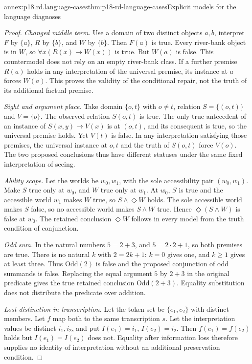 \begin{annexitem}{annex:p18.rd.language-cases}{thm:p18-rd-language-cases}{Explicit models for the language diagnoses}
\begin{proof}
\emph{Changed middle term.} Use a domain of two distinct objects
\(a,b\), interpret \(F\) by \(\{a\}\), \(R\) by
\(\{b\}\), and \(W\) by \(\{b\}\). Then \(F(a)\)
is true. Every river-bank object is in \(W\), so
\(\forall x(R(x)\to W(x))\) is true. But \(W(a)\) is false.
This countermodel does not rely on an empty river-bank class. If a
further premise \(R(a)\) holds in any interpretation of the
universal premise, its instance at \(a\) forces \(W(a)\).
This proves the validity of the conditional repair, not the truth
of its additional factual premise.

\emph{Sight and argument place.} Take domain \(\{o,t\}\)
with \(o\ne t\), relation \(S=\{(o,t)\}\) and
\(V=\{o\}\). The observed relation \(S(o,t)\) is true.
The only true antecedent of an instance of
\(S(x,y)\to V(x)\) is at \((o,t)\), and its consequent
is true, so the universal premise holds. Yet \(V(t)\) is false.
In any interpretation satisfying those premises, the universal
instance at \(o,t\) and the truth of \(S(o,t)\) force
\(V(o)\). The two proposed conclusions thus have different
statuses under the same fixed interpretation of seeing.

\emph{Ability scope.} Let the worlds be \(w_0,w_1\), with
the sole accessibility pair \((w_0,w_1)\). Make \(S\) true
only at \(w_0\), and \(W\) true only at \(w_1\).
At \(w_0\), \(S\) is true and the accessible world \(w_1\)
makes \(W\) true, so \(S\land\Diamond W\) holds.
The sole accessible world makes \(S\) false, so no accessible
world makes \(S\land W\) true. Hence
\(\Diamond(S\land W)\) is false at \(w_0\).
The retained conclusion \(\Diamond W\) follows in every model
from the truth condition of conjunction.

\emph{Odd sum.} In the natural numbers \(5=2+3\), and
\(5=2\cdot2+1\), so both premises are true. There is no natural
\(k\) with \(2=2k+1\): \(k=0\) gives one, and
\(k\geq1\) gives at least three. Thus \(\mathrm{Odd}(2)\)
is false and the proposed conjunction of odd summands is false.
Replacing the equal argument \(5\) by \(2+3\) in the
original predicate gives the true retained conclusion
\(\mathrm{Odd}(2+3)\). Equality substitution does not distribute
the predicate over addition.

\emph{Lost distinction in transcription.} Let the token set be
\(\{e_1,e_2\}\) with distinct members. Let \(f\) map both
to the same transcription \(s\). Let the interpretation values
be distinct \(i_1,i_2\), and put \(I(e_1)=i_1\),
\(I(e_2)=i_2\). Then \(f(e_1)=f(e_2)\) holds but
\(I(e_1)=I(e_2)\) does not. Equality after information loss
therefore supplies no identity of interpretation without an additional
preservation condition.


\end{proof}
\end{annexitem}
